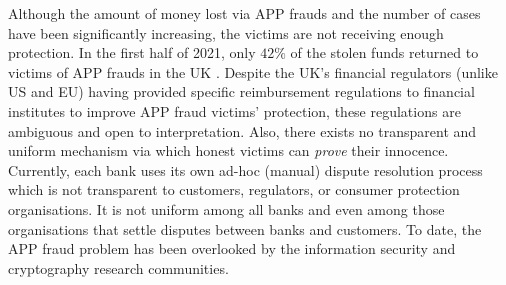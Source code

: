 %
%





Although the amount of money lost via  APP frauds and the number of cases have been significantly increasing, the victims are not receiving enough protection.  In the first half of 2021, only $42\%$ of the stolen funds returned to victims of  APP frauds in the UK \cite{2021-Half-Year-Fraud-Update}.  Despite the UK's financial regulators (unlike   US and EU) having provided specific reimbursement regulations to financial institutes to improve APP fraud victims' protection, these regulations are ambiguous and open to interpretation. Also,  there exists no transparent and uniform mechanism via which honest victims can  \emph{prove} their innocence. Currently, each bank uses its own ad-hoc (manual) dispute resolution process which is not transparent to customers, regulators, or consumer protection organisations. It is not uniform among all banks and even among those organisations that settle disputes between banks and customers. To date, the APP fraud problem has been overlooked by the information security and cryptography research communities.



